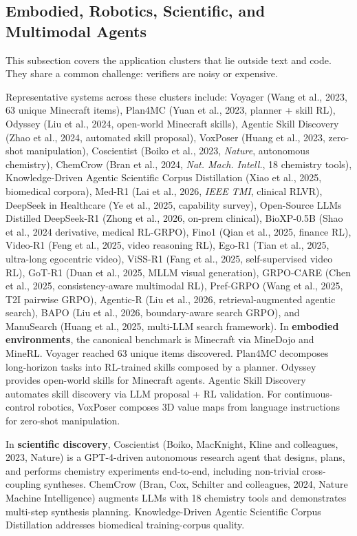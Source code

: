 \documentclass{article}
\begin{document}
\subsection{Embodied, Robotics, Scientific, and Multimodal Agents}\label{embodied-robotics-scientific-and-multimodal-agents}

This subsection covers the application clusters that lie outside text and code. They share a common challenge: verifiers are noisy or expensive.

Representative systems across these clusters include: Voyager (Wang et al., 2023, 63 unique Minecraft items), Plan4MC (Yuan et al., 2023, planner + skill RL), Odyssey (Liu et al., 2024, open-world Minecraft skills), Agentic Skill Discovery (Zhao et al., 2024, automated skill proposal), VoxPoser (Huang et al., 2023, zero-shot manipulation), Coscientist (Boiko et al., 2023, \emph{Nature}, autonomous chemistry), ChemCrow (Bran et al., 2024, \emph{Nat. Mach. Intell.}, 18 chemistry tools), Knowledge-Driven Agentic Scientific Corpus Distillation (Xiao et al., 2025, biomedical corpora), Med-R1 (Lai et al., 2026, \emph{IEEE TMI}, clinical RLVR), DeepSeek in Healthcare (Ye et al., 2025, capability survey), Open-Source LLMs Distilled DeepSeek-R1 (Zhong et al., 2026, on-prem clinical), BioXP-0.5B (Shao et al., 2024 derivative, medical RL-GRPO), Fino1 (Qian et al., 2025, finance RL), Video-R1 (Feng et al., 2025, video reasoning RL), Ego-R1 (Tian et al., 2025, ultra-long egocentric video), ViSS-R1 (Fang et al., 2025, self-supervised video RL), GoT-R1 (Duan et al., 2025, MLLM visual generation), GRPO-CARE (Chen et al., 2025, consistency-aware multimodal RL), Pref-GRPO (Wang et al., 2025, T2I pairwise GRPO), Agentic-R (Liu et al., 2026, retrieval-augmented agentic search), BAPO (Liu et al., 2026, boundary-aware search GRPO), and ManuSearch (Huang et al., 2025, multi-LLM search framework). In \textbf{embodied environments}, the canonical benchmark is Minecraft via MineDojo and MineRL. Voyager \citep{wang20232023} reached 63 unique items discovered. Plan4MC \citep{yuan20232023} decomposes long-horizon tasks into RL-trained skills composed by a planner. Odyssey \citep{liu20242024} provides open-world skills for Minecraft agents. Agentic Skill Discovery \citep{zhao2024agenticskilldiscov} automates skill discovery via LLM proposal + RL validation. For continuous-control robotics, VoxPoser \citep{huang20232023} composes 3D value maps from language instructions for zero-shot manipulation.

In \textbf{scientific discovery}, Coscientist (Boiko, MacKnight, Kline and colleagues, 2023, Nature) is a GPT-4-driven autonomous research agent that designs, plans, and performs chemistry experiments end-to-end, including non-trivial cross-coupling syntheses. ChemCrow (Bran, Cox, Schilter and colleagues, 2024, Nature Machine Intelligence) augments LLMs with 18 chemistry tools and demonstrates multi-step synthesis planning. Knowledge-Driven Agentic Scientific Corpus Distillation \citep{xiao20252025} addresses biomedical training-corpus quality.
\end{document}
